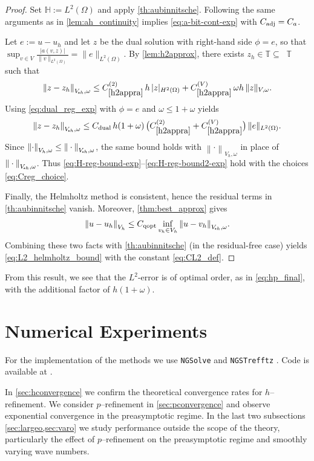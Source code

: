 \documentclass[11pt]{article}
\theoremstyle{definition}
\theoremstyle{plain}
\newcommand{\Ca}{C_a}
\newcommand{\const}[1]{C_{\eqref{#1}}}
\newcommand{\Vsh}{V_{\!\star \hspace*{-0.2mm}h}}
\newcommand{\dgnorm}[1]{\norm{#1}_{V_h}}
\newcommand{\dgonorm}[1]{\norm{#1}_{V_h,\omega}}
\newcommand{\tdgonorm}[1]{{\Vert#1\Vert}_{\Vsh,\omega}}
\DeclareMathOperator{\tch}{T_h}
\newcommand*{\norm}[1]{\left\|#1\right\|}
\newcommand{\IH}{\mathbb{H}}
\newcommand{\ITh}{\mathbb{T}}
\begin{document}
\begin{proof}
Set $\IH:=L^2(\Omega)$ and apply \cref{th:aubinnitsche}.
Following the same arguments as in \cref{lem:ah_continuity} implies \eqref{eq:a-bit-cont-exp} with $C_{\rm adj}=\Ca$.

Let $e:=u-u_h$ and let $z$ be the dual solution with right-hand side $\phi=e$, so that
$\sup_{v\in V}\frac{|a(v,z)|}{\|v\|_{L^2(\Omega)}}=\|e\|_{L^2(\Omega)}$.
By \cref{lem:h2approx}, there exists $z_h\in \ITh\subseteq\tch\ITh$ such that
\[
\tdgonorm{z-z_h}
\le \const{h2appra}^{(2)}\,h\,|z|_{H^2(\Omega)}
    +\const{h2appra}^{(V)}\,\omega h\,\|z\|_{V,\omega}.
\]
Using \eqref{eq:dual_reg_exp} with $\phi=e$ and $\omega\le 1+\omega$ yields
\[
\tdgonorm{z-z_h}
\le
C_{\rm dual}\,h(1+\omega)\,\bigl(\const{h2appra}^{(2)}+\const{h2appra}^{(V)}\bigr)\,\|e\|_{L^2(\Omega)}.
\]
Since $\dgonorm{\cdot}\le \tdgonorm{\cdot}$, the same bound holds with $\dgonorm{\cdot}$ in place of $\tdgonorm{\cdot}$.
Thus \eqref{eq:H-reg-bound-exp}--\eqref{eq:H-reg-bound2-exp} hold with the choices \eqref{eq:Creg_choice}.

Finally, the Helmholtz method is consistent, hence the residual terms in \cref{th:aubinnitsche} vanish.
Moreover, \cref{thm:best_approx} gives
\[
\dgnorm{u-u_h}\le C_{\rm qopt}\inf_{v_h\in V_h}\tdgonorm{u-v_h}.
\]
Combining these two facts with \cref{th:aubinnitsche} (in the residual-free case) yields
\eqref{eq:L2_helmholtz_bound} with the constant \eqref{eq:CL2_def}.
\end{proof}
From this result, we see that the $L^2$-error is of optimal order, as in \eqref{eq:hp_final}, with the additional factor of $h(1+\omega)$.




\section{Numerical Experiments}\label{sec:numerics}

For the implementation of the methods we use \texttt{NGSolve} \cite{ngsolve} and \texttt{NGSTrefftz} \cite{ngstrefftz}. Code is available at \cite{stocker_2026_18985575}.

In \cref{sec:hconvergence} we confirm the theoretical convergence rates for $h$--refinement. 
We consider $p$--refinement in \cref{sec:pconvergence} and observe exponential convergence in the preasymptotic regime.
In the last two subsections \cref{sec:largeo,sec:varo} we study performance outside the scope of the theory, particularly the effect of $p$--refinement on the preasymptotic regime and smoothly varying wave numbers.
\end{document}
